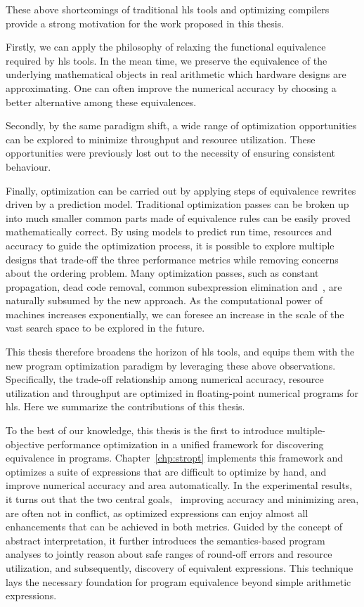These above shortcomings of traditional \gls{hls} tools and optimizing
compilers provide a strong motivation for the work proposed in this thesis.

Firstly, we can apply the philosophy of relaxing the functional equivalence
required by \gls{hls} tools.  In the mean time, we preserve the equivalence of
the underlying mathematical objects in real arithmetic which hardware designs
are approximating.  One can often improve the numerical accuracy by choosing a
better alternative among these equivalences.

Secondly, by the same paradigm shift, a wide range of optimization
opportunities can be explored to minimize throughput and resource utilization.
These opportunities were previously lost out to the necessity of ensuring
consistent behaviour.

Finally, optimization can be carried out by applying steps of equivalence
rewrites driven by a prediction model.  Traditional optimization passes can
be broken up into much smaller common parts made of equivalence rules can be
easily proved mathematically correct.  By using models to predict run time,
resources and accuracy to guide the optimization process, it is possible to
explore multiple designs that trade-off the three performance metrics while
removing concerns about the ordering problem.  Many optimization passes, such
as constant propagation, dead code removal, common subexpression elimination
and~\etc, are naturally subsumed by the new approach.  As the computational
power of machines increases exponentially, we can foresee an increase in the
scale of the vast search space to be explored in the future.

This thesis therefore broadens the horizon of \gls{hls} tools, and equips
them with the new program optimization paradigm by leveraging these above
observations.  Specifically, the trade-off relationship among numerical
accuracy, resource utilization and throughput are optimized in floating-point
numerical programs for \gls{hls}\@.  Here we summarize the contributions of
this thesis.

To the best of our knowledge, this thesis is the first to introduce
multiple-objective performance optimization in a unified framework for
discovering equivalence in programs.  Chapter~\ref{chp:stropt} implements
this framework and optimizes a suite of expressions that are difficult to
optimize by hand, and improve numerical accuracy and area automatically.
In the experimental results, it turns out that the two central goals,
\ie~improving accuracy and minimizing area, are often not in conflict, as
optimized expressions can enjoy almost all enhancements that can be achieved
in both metrics.  Guided by the concept of abstract interpretation, it further
introduces the semantics-based program analyses to jointly reason about
safe ranges of round-off errors and resource utilization, and subsequently,
discovery of equivalent expressions.  This technique lays the necessary
foundation for program equivalence beyond simple arithmetic expressions.

